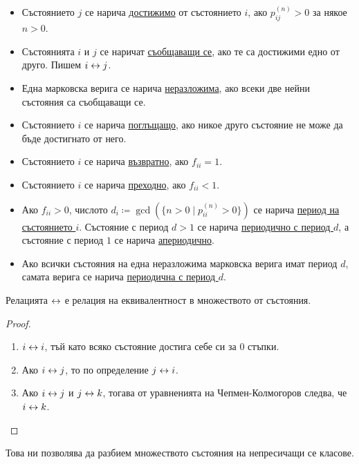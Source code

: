 \documentclass[numbers=endperiod, DIV=15, bibliography=totocnumbered]{scrartcl}
\begin{document}
\begin{definition}
  \mbox{}
  \begin{itemize}
    \item Състоянието $j$ се нарича \uline{достижимо} от състоянието $i$, ако $p^{(n)}_{ij} > 0$ за някое $n > 0$.
    \item Състоянията $i$ и $j$ се наричат \uline{съобщаващи се}, ако те са достижими едно от друго. Пишем $i \leftrightarrow j$.
    \item Една марковска верига се нарича \uline{неразложима}, ако всеки две нейни състояния са съобщаващи се.
    \item Състоянието $i$ се нарича \uline{поглъщащо}, ако никое друго състояние не може да бъде достигнато от него.
    \item Състоянието $i$ се нарича \uline{възвратно}, ако $f_{ii} = 1$.
    \item Състоянието $i$ се нарича \uline{преходно}, ако $f_{ii} < 1$.
    \item Ако $f_{ii} > 0$, числото $d_i \coloneqq \gcd (\{ n > 0 \mid p_{ii}^{(n)} > 0 \})$ се нарича \uline{период на състоянието $i$}. Състояние с период $d > 1$ се нарича \uline{периодично с период $d$}, а състояние с период $1$ се нарича \uline{апериодично}.
    \item Ако всички състояния на една неразложима марковска верига имат период $d$, самата верига се нарича \uline{периодична с период $d$}.
  \end{itemize}
\end{definition}

\begin{proposition}
  Релацията $\leftrightarrow$ е релация на еквивалентност в множеството от състояния.
\end{proposition}
\begin{proof}
  \mbox{}
  \begin{enumerate}
    \item $i \leftrightarrow i$, тъй като всяко състояние достига себе си за $0$ стъпки.
    \item Ако $i \leftrightarrow j$, то по определение $j \leftrightarrow i$.
    \item Ако $i \leftrightarrow j$ и $j \leftrightarrow k$, тогава от уравненията на Чепмен-Колмогоров следва, че $i \leftrightarrow k$.
  \end{enumerate}
\end{proof}

Това ни позволява да разбием множеството състояния на непресичащи се класове.
\end{document}
